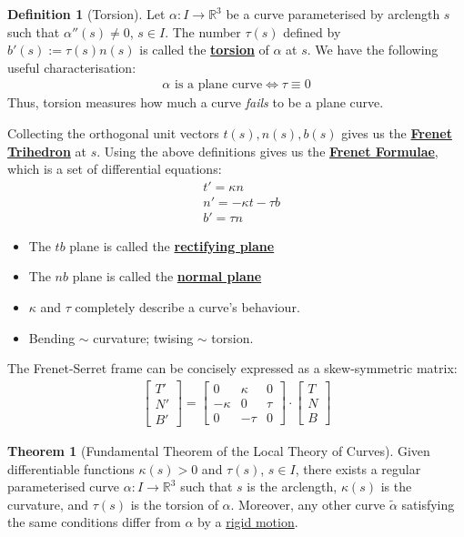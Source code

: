 \documentclass[11pt]{scrartcl}
\newcommand{\R}[0]{\mathbb{R}}
\theoremstyle{definition}
\newtheorem{theorem}{Theorem}
\newtheorem{definition}{Definition}
\theoremstyle{remark}
\newcommand{\dfn}[1]{\textbf{\underline{#1}}}
\begin{document}
\begin{definition}[Torsion]
	Let $\alpha: I \rightarrow \R^3$ be a curve parameterised by arclength $s$ such that $\alpha''(s) \neq 0$, $s \in I$. The number $\tau(s)$ defined by $b'(s) := \tau(s)  n(s)$ is called the \dfn{torsion} of $\alpha$ at $s$. We have the following useful characterisation: 
	\begin{align*}
		\alpha \text{ is a plane curve} \iff \tau \equiv 0
	\end{align*}
	Thus, torsion measures how much a curve \emph{fails} to be a plane curve. 
\end{definition}

Collecting the orthogonal unit vectors $t(s), n(s), b(s)$ gives us the \dfn{Frenet Trihedron} at $s$. Using the above definitions gives us the \dfn{Frenet Formulae}, which is a set of differential equations: 
\begin{align}
	& t' = \kappa n \\
	& n' = - \kappa t - \tau b \\
	& b' = \tau n 	
\end{align}
\begin{itemize}[noitemsep]
	\item The $tb$ plane is called the \dfn{rectifying plane} 
	\item The $nb$ plane is called the \dfn{normal plane} 
	\item $\kappa$ and $\tau$ completely describe a curve's behaviour. 
	\item Bending $\sim$ curvature; twising $\sim$ torsion. 
\end{itemize}
The Frenet-Serret frame can be concisely expressed as a skew-symmetric matrix: 
\begin{align}
	\begin{bmatrix}
		T' \\
		N ' \\
		B' 
	\end{bmatrix}	 = \begin{bmatrix}
		0 & \kappa & 0 \\
		- \kappa & 0 & \tau \\
		0 & - \tau & 0 
	\end{bmatrix} \cdot \begin{bmatrix}
		T \\
		N \\
		B
	\end{bmatrix}
\end{align}

\begin{theorem}[Fundamental Theorem of the Local Theory of Curves]
	Given differentiable functions  $\kappa(s) > 0$ and $\tau(s)$, $s \in I$, there exists a regular parameterised curve $\alpha: I \rightarrow \R^3$ such that $s$ is the arclength, $\kappa(s)$ is the curvature, and $\tau(s)$ is the torsion of $\alpha$. Moreover, any other curve $\widetilde{\alpha}$ satisfying the same conditions differ from $\alpha$ by a \underline{rigid motion}. 
\end{theorem}
\end{document}
